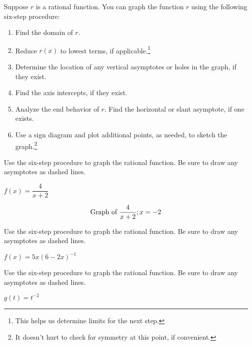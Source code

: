 \documentclass{ximera}
\begin{document}
	\author{Stitz-Zeager}


Suppose $r$ is a rational function.  You can graph the function $r$ using the following six-step procedure:

\begin{enumerate}

\item  Find the domain of $r$.

\item  Reduce $r(x)$ to lowest terms, if applicable.\footnote{This helps us determine limits for the next step.}

\item  Determine the location of any vertical asymptotes or holes in the graph, if they exist. 

\item  Find the axis intercepts, if they exist.

\item  Analyze the end behavior of $r$.  Find the horizontal or slant asymptote, if one exists.

\item  Use a sign diagram and plot additional points, as needed, to sketch the graph.\footnote{It doesn't hurt to check for symmetry at this point, if convenient.}

\end{enumerate}

\begin{problem}\label{sixstepfirst}
Use the six-step procedure
to graph the rational function.  Be sure to draw any asymptotes as dashed lines.

$f(x) = \dfrac{4}{x + 2}$

\begin{solution}
\[
\graph[xmin=-7, xmax=5, ymin=-5, ymax=5,panel]{\frac{4}{x+2};x=-2}
\]
\end{solution}
\end{problem}

\begin{problem}
Use the six-step procedure
to graph the rational function.  Be sure to draw any asymptotes as dashed lines.

$f(x) = 5x(6-2x)^{-1}$ 
\end{problem}  

\begin{problem}
Use the six-step procedure
to graph the rational function.  Be sure to draw any asymptotes as dashed lines.

$g(t) = t^{-2}$
\end{problem} 
\end{document}
